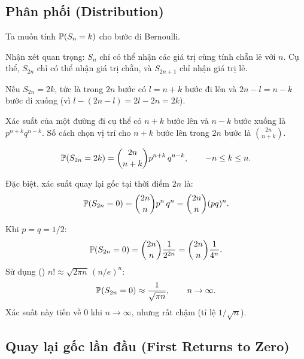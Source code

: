 \subsection{Phân phối (Distribution)}
\label{subsec:distribution}

Ta muốn tính $\mathbb{P}(S_n = k)$ cho bước đi Bernoulli.

Nhận xét quan trọng: $S_n$ chỉ có thể nhận các giá trị cùng tính chẵn lẻ với $n$.
Cụ thể, $S_{2n}$ chỉ có thể nhận giá trị chẵn, và $S_{2n+1}$ chỉ nhận giá trị lẻ.

Nếu $S_{2n} = 2k$, tức là trong $2n$ bước có $l = n+k$ bước đi lên và $2n - l = n - k$ bước đi xuống
(vì $l - (2n-l) = 2l - 2n = 2k$).

Xác suất của một đường đi cụ thể có $n+k$ bước lên và $n-k$ bước xuống là $p^{n+k}q^{n-k}$.
Số cách chọn vị trí cho $n+k$ bước lên trong $2n$ bước là $\binom{2n}{n+k}$.

\begin{dinhly}
\label{thm:dist-S2n}
\begin{equation}\label{eq:dist-S2n}
  \mathbb{P}(S_{2n} = 2k) = \binom{2n}{n+k} p^{n+k}\,q^{n-k}, \qquad -n \leq k \leq n.
\end{equation}
\end{dinhly}

Đặc biệt, xác suất quay lại gốc tại thời điểm $2n$ là:
\begin{equation}\label{eq:return-origin}
  \mathbb{P}(S_{2n} = 0) = \binom{2n}{n} p^n\,q^n = \binom{2n}{n}(pq)^n.
\end{equation}

\begin{example}[Bước đi đối xứng $p = q = 1/2$]
\label{ex:symmetric-dist}
Khi $p = q = 1/2$:
\[
  \mathbb{P}(S_{2n} = 0) = \binom{2n}{n}\frac{1}{2^{2n}} = \binom{2n}{n}\frac{1}{4^n}.
\]
Sử dụng  () $n! \approx \sqrt{2\pi n}\,(n/e)^n$:
\begin{equation}\label{eq:stirling-return}
  \mathbb{P}(S_{2n} = 0) \approx \frac{1}{\sqrt{\pi n}}, \qquad n \to \infty.
\end{equation}
Xác suất này tiến về $0$ khi $n \to \infty$, nhưng rất chậm (tỉ lệ $1/\sqrt{n}$).
\end{example}

\subsection{Quay lại gốc lần đầu (First Returns to Zero)}
\label{subsec:first-return}

